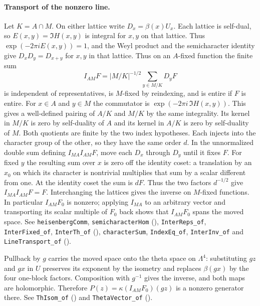 \paragraph{Transport of the nonzero line.}
\label{r16:ktheta-transport}
Let $K=A\cap M$. On either lattice write $D_x=\beta(x)U_x$.
Each lattice is self-dual, so $E(x,y)=\Im H(x,y)$ is integral for
$x,y$ on that lattice. Thus $\exp(-2\pi i E(x,y))=1$, and
the Weyl product and the semicharacter identity give $D_xD_y=D_{x+y}$
for $x,y$ in that lattice. Thus on an $A$-fixed function the finite sum
\[
 I_{AM}F=|M/K|^{-1/2}\sum_{y\in M/K}D_yF
\]
is independent of representatives, is $M$-fixed by reindexing, and is
entire if $F$ is entire. For $x\in A$ and $y\in M$ the commutator
is $\exp(-2\pi i\,\Im H(x,y))$. This gives a well-defined pairing
of $A/K$ and $M/K$ by the same integrality.
Its kernel in $M/K$ is zero by self-duality of $A$ and its kernel in
$A/K$ is zero by self-duality of $M$. Both quotients are finite by
the two index hypotheses. Each injects into the character group of
the other, so they have the same order $d$. In the unnormalized
double sum defining $I_{MA}I_{AM}F$, move each $D_x$ through $D_y$
until it fixes $F$. For fixed $y$ the resulting sum over $x$ is zero
off the identity coset: a translation by an $x_0$ on which its
character is nontrivial multiplies that sum by a scalar different from one. At the identity coset
the sum is $dF$. Thus the two factors $d^{-1/2}$ give
$I_{MA}I_{AM}F=F$. Interchanging the lattices gives the inverse on
$M$-fixed functions. In particular $I_{AM}F_0$ is nonzero; applying
$I_{MA}$ to an arbitrary vector and transporting its scalar multiple
of $F_0$ back shows that $I_{AM}F_0$ spans the moved space.
See \nolinkurl{heisenbergComm}, \nolinkurl{semicharacterHom}
(),
\nolinkurl{InterReps_of}, \nolinkurl{InterFixed_of}, \nolinkurl{InterTh_of}
(),
\nolinkurl{characterSum}, \nolinkurl{IndexEq_of}, \nolinkurl{InterInv_of}
and \nolinkurl{LineTransport_of}
().

Pullback by $g$ carries the moved space onto the theta space on
$\Lambda^4$: substituting $gz$ and $gx$ in $U$ preserves its
exponent by the isometry and replaces $\beta(gx)$ by the four
one-block factors. Composition with $g^{-1}$ gives the inverse,
and both maps are holomorphic. Therefore
$P(z)=\kappa(I_{AM}F_0)(gz)$ is a nonzero generator there.
See \nolinkurl{ThIsom_of} ()
and \nolinkurl{ThetaVector_of}
().

